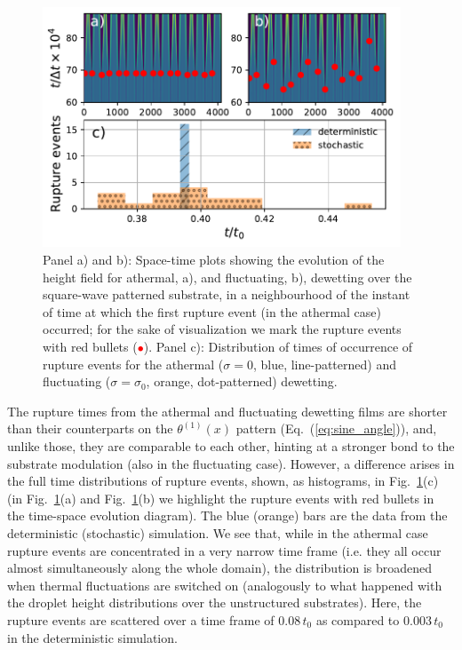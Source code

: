 \begin{figure}
    \centering
    \includegraphics[width=0.95\textwidth]{graphics/Rupture_events_with_film.pdf}
    \caption{Panel a) and b): Space-time plots showing the evolution of the height field for athermal, a), and fluctuating, b), dewetting over the square-wave patterned substrate, 
    in a neighbourhood of the instant of time at which the first rupture event (in the athermal case) occurred; for the sake of visualization we mark the rupture events with red bullets (\textcolor{red}{$\bullet$}).
    Panel c): Distribution of times of occurrence of rupture events for the athermal ($\sigma=0$, blue, line-patterned) and fluctuating ($\sigma = \sigma_0$, orange, dot-patterned) dewetting.} 
    \label{fig:rupture_time_distri_square_wave8}
\end{figure}
The rupture times from the athermal and fluctuating dewetting films are shorter than their counterparts on the $\theta^{(1)}(x)$ pattern (Eq.~(\ref{eq:sine_angle})), and, unlike those, they are comparable to each other, hinting at a stronger bond to the substrate modulation (also in the fluctuating case).
However, a difference arises in the full time distributions of rupture events, shown, as histograms, in Fig.~\ref{fig:rupture_time_distri_square_wave8}(c) (in Fig.~\ref{fig:rupture_time_distri_square_wave8}(a) and Fig.~\ref{fig:rupture_time_distri_square_wave8}(b) we highlight the rupture events with red bullets in the time-space evolution diagram).
The blue (orange) bars are the data from the deterministic (stochastic) simulation.
We see that, while in the athermal case rupture events are concentrated in a very narrow time frame (i.e. they all occur almost simultaneously along the whole domain), the distribution is broadened when thermal fluctuations are switched on (analogously to what happened with the droplet height distributions over the unstructured substrates).
Here, the rupture events are scattered over a time frame of $0.08\,t_0$ as compared to $0.003\,t_0$ in the deterministic simulation.

